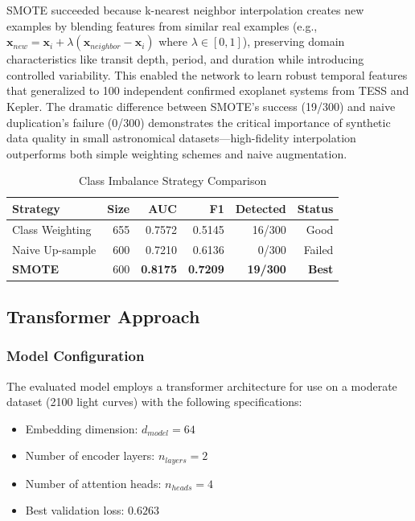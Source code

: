 \documentclass[letterpaper]{article} %
\begin{document}
  SMOTE succeeded because k-nearest neighbor interpolation creates new examples by blending features from similar real examples (e.g., $\mathbf{x}_{new} =       
  \mathbf{x}_i + \lambda(\mathbf{x}_{neighbor} - \mathbf{x}_i)$ where $\lambda \in [0,1]$), preserving domain characteristics like transit depth, period, and    
   duration while introducing controlled variability. This enabled the network to learn robust temporal features that generalized to 100 independent
  confirmed exoplanet systems from TESS and Kepler. The dramatic difference between SMOTE's success (19/300) and naive duplication's failure (0/300)
  demonstrates the critical importance of synthetic data quality in small astronomical datasets—high-fidelity interpolation outperforms both simple weighting    
   schemes and naive augmentation.

  \begin{table}[h]
  \centering
  \caption{Class Imbalance Strategy Comparison}
  \label{tab:smote_comparison}
  \begin{tabular}{@{}lrrrrr@{}}
  \toprule
  \textbf{Strategy} & \textbf{Size} & \textbf{AUC} & \textbf{F1} & \textbf{Detected} & \textbf{Status} \\
  \midrule
  Class Weighting & 655 & 0.7572 & 0.5145 & 16/300 & Good \\
  Naive Up-sample & 600 & 0.7210 & 0.6136 & 0/300 & Failed \\
  \textbf{SMOTE} & 600 & \textbf{0.8175} & \textbf{0.7209} & \textbf{19/300} & \textbf{Best} \\
  \bottomrule
  \end{tabular}
  \end{table}
\subsection{Transformer Approach}

\subsubsection*{Model Configuration}
The evaluated model employs a  transformer architecture for use on a moderate dataset (2100 light curves) with the following specifications:
\begin{itemize}
    \item Embedding dimension: \(d_{model} = 64\)
    \item Number of encoder layers: \(n_{layers} = 2\)
    \item Number of attention heads: \(n_{heads} = 4\)
    \item Best validation loss: \(0.6263\)
\end{itemize}
\end{document}
